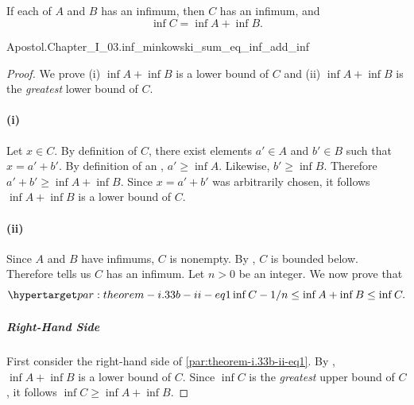 \documentclass{report}
\begin{document}
\subsection{}%

  \begin{theorem}[I.33b]
    If each of $A$ and $B$ has an infimum, then $C$ has an infimum, and
      $$\inf{C} = \inf{A} + \inf{B}.$$
  \end{theorem}

    {Apostol.Chapter\_I\_03.inf\_minkowski\_sum\_eq\_inf\_add\_inf}

  \begin{proof}

    We prove (i) $\inf{A} + \inf{B}$ is a lower bound of $C$ and (ii)
      $\inf{A} + \inf{B}$ is the \textit{greatest} lower bound of $C$.

    \paragraph{(i)}%

      Let $x \in C$.
      By definition of $C$, there exist elements $a' \in A$ and $b' \in B$ such
        that $x = a' + b'$.
      By definition of an , $a' \geq \inf{A}$.
      Likewise, $b' \geq \inf{B}$.
      Therefore $a' + b' \geq \inf{A} + \inf{B}$.
      Since $x = a' + b'$ was arbitrarily chosen, it follows $\inf{A} + \inf{B}$
        is a lower bound of $C$.

    \paragraph{(ii)}%

      Since $A$ and $B$ have infimums, $C$ is nonempty.
      By , $C$ is bounded below.
      Therefore  tells us $C$ has an infimum.
      Let $n > 0$ be an integer.
      We now prove that
        \begin{equation}
          \hyperlabel{par:theorem-i.33b-ii-eq1}
          \inf{C} - 1 / n \leq \inf{A} + \inf{B} \leq \inf{C}.
        \end{equation}

      \subparagraph{Right-Hand Side}%

        First consider the right-hand side of \eqref{par:theorem-i.33b-ii-eq1}.
        By , $\inf{A} + \inf{B}$ is a lower bound
          of $C$.
        Since $\inf{C}$ is the \textit{greatest} upper bound of $C$, it follows
          $\inf{C} \geq \inf{A} + \inf{B}$.


\end{proof}
\end{document}
